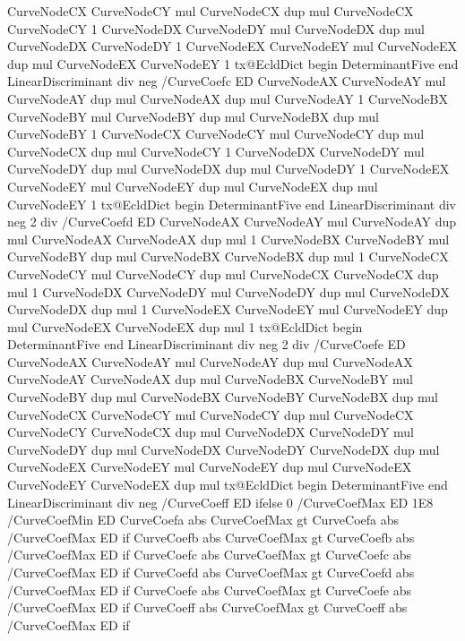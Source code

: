 {{        CurveNodeCX CurveNodeCY mul CurveNodeCX dup mul CurveNodeCX CurveNodeCY 1
        CurveNodeDX CurveNodeDY mul CurveNodeDX dup mul CurveNodeDX CurveNodeDY 1
        CurveNodeEX CurveNodeEY mul CurveNodeEX dup mul CurveNodeEX CurveNodeEY 1
        tx@EcldDict begin DeterminantFive end LinearDiscriminant div neg /CurveCoefc ED
        CurveNodeAX CurveNodeAY mul CurveNodeAY dup mul CurveNodeAX dup mul CurveNodeAY 1
        CurveNodeBX CurveNodeBY mul CurveNodeBY dup mul CurveNodeBX dup mul CurveNodeBY 1
        CurveNodeCX CurveNodeCY mul CurveNodeCY dup mul CurveNodeCX dup mul CurveNodeCY 1
        CurveNodeDX CurveNodeDY mul CurveNodeDY dup mul CurveNodeDX dup mul CurveNodeDY 1
        CurveNodeEX CurveNodeEY mul CurveNodeEY dup mul CurveNodeEX dup mul CurveNodeEY 1
        tx@EcldDict begin DeterminantFive end LinearDiscriminant div neg 2 div /CurveCoefd ED
        CurveNodeAX CurveNodeAY mul CurveNodeAY dup mul CurveNodeAX CurveNodeAX dup mul 1
        CurveNodeBX CurveNodeBY mul CurveNodeBY dup mul CurveNodeBX CurveNodeBX dup mul 1
        CurveNodeCX CurveNodeCY mul CurveNodeCY dup mul CurveNodeCX CurveNodeCX dup mul 1
        CurveNodeDX CurveNodeDY mul CurveNodeDY dup mul CurveNodeDX CurveNodeDX dup mul 1
        CurveNodeEX CurveNodeEY mul CurveNodeEY dup mul CurveNodeEX CurveNodeEX dup mul 1
        tx@EcldDict begin DeterminantFive end LinearDiscriminant div neg 2 div /CurveCoefe ED
        CurveNodeAX CurveNodeAY mul CurveNodeAY dup mul CurveNodeAX CurveNodeAY CurveNodeAX dup mul
        CurveNodeBX CurveNodeBY mul CurveNodeBY dup mul CurveNodeBX CurveNodeBY CurveNodeBX dup mul
        CurveNodeCX CurveNodeCY mul CurveNodeCY dup mul CurveNodeCX CurveNodeCY CurveNodeCX dup mul
        CurveNodeDX CurveNodeDY mul CurveNodeDY dup mul CurveNodeDX CurveNodeDY CurveNodeDX dup mul
        CurveNodeEX CurveNodeEY mul CurveNodeEY dup mul CurveNodeEX CurveNodeEY CurveNodeEX dup mul
        tx@EcldDict begin DeterminantFive end LinearDiscriminant div neg /CurveCoeff ED
      } ifelse
      0 /CurveCoefMax ED 1E8 /CurveCoefMin ED
      CurveCoefa abs CurveCoefMax gt {CurveCoefa abs /CurveCoefMax ED} if
      CurveCoefb abs CurveCoefMax gt {CurveCoefb abs /CurveCoefMax ED} if
      CurveCoefc abs CurveCoefMax gt {CurveCoefc abs /CurveCoefMax ED} if
      CurveCoefd abs CurveCoefMax gt {CurveCoefd abs /CurveCoefMax ED} if
      CurveCoefe abs CurveCoefMax gt {CurveCoefe abs /CurveCoefMax ED} if
      CurveCoeff abs CurveCoefMax gt {CurveCoeff abs /CurveCoefMax ED} if
}
